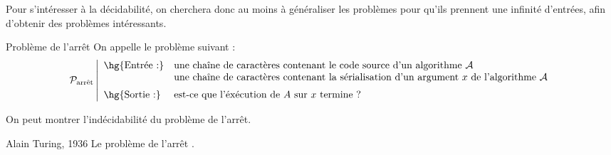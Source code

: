 \documentclass[a4paper,french,bookmarks]{book}
\begin{document}
            
        Pour s'intéresser à la décidabilité, on cherchera donc au moins à généraliser les problèmes pour qu'ils prennent une infinité d'entrées, afin d'obtenir des problèmes intéressants.
    

    
    
    \begin{definition}{Problème de l'arrêt}{}
        On appelle  le problème suivant :
        \[ \bcP_\text{arrêt} \left\vert\begin{array}{ll}
            \hg{\text{Entrée :}} & \text{une chaîne de caractères contenant le code source d'un algorithme $\bcA$}\\
            & \text{une chaîne de caractères contenant la sérialisation d'un argument $x$ de l'algorithme $\bcA$}\\[0.2cm]
            \hg{\text{Sortie :}} & \text{est-ce que l'éxécution de $A$ sur $x$ termine ?}
        \end{array}\right.\]
    \end{definition}
    
    On peut montrer l'indécidabilité du problème de l'arrêt.
    
    \begin{theorem}{Alain Turing, 1936}{}
        Le problème de l'arrêt .
    \end{theorem}
    
\end{document}
